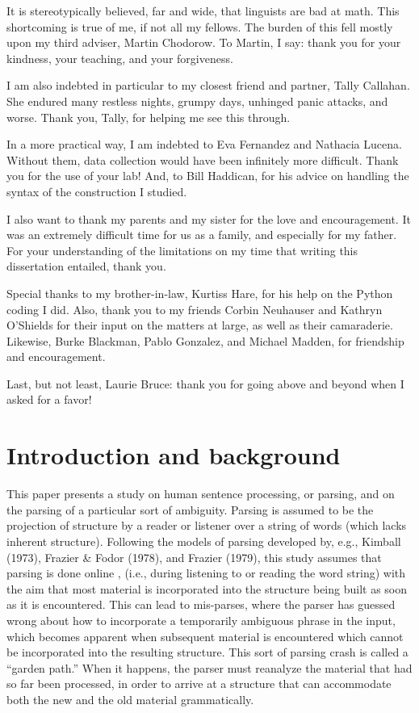 \documentclass[12pt,oneside]{book}
\begin{document}
It is stereotypically believed, far and wide, that linguists are bad at math. This shortcoming is true of me, if not all my fellows. The burden of this fell mostly upon my third adviser, Martin Chodorow. To Martin, I say: thank you for your kindness, your teaching, and your forgiveness.

I am also indebted in particular to my closest friend and partner, Tally Callahan. She endured many restless nights, grumpy days, unhinged panic attacks, and worse. Thank you, Tally, for helping me see this through.

In a more practical way, I am indebted to Eva Fernandez and Nathacia Lucena. Without them, data collection would have been infinitely more difficult. Thank you for the use of your lab! And, to Bill Haddican, for his advice on handling the syntax of the construction I studied.

I also want to thank my parents and my sister for the love and encouragement. It was an extremely difficult time for us as a family, and especially for my father. For your understanding of the limitations on my time that writing this dissertation entailed, thank you.

Special thanks to my brother-in-law, Kurtiss Hare, for his help on the Python coding I did. Also, thank you to my friends Corbin Neuhauser and Kathryn O'Shields for their input on the matters at large, as well as their camaraderie. Likewise, Burke Blackman, Pablo Gonzalez, and Michael Madden, for friendship and encouragement.

Last, but not least, Laurie Bruce: thank you for going above and beyond when I asked for a favor!

\pagebreak


\hypertarget{introduction-and-background}{%
\chapter{Introduction and background}\label{introduction-and-background}}

This paper presents a study on human sentence processing, or parsing, and on the parsing of a particular sort of ambiguity. Parsing is assumed to be the projection of structure by a reader or listener over a string of words (which lacks inherent structure). Following the models of parsing developed by, e.g., Kimball (1973), Frazier \& Fodor (1978), and Frazier (1979), this study assumes that parsing is done online , (i.e., during listening to or reading the word string) with the aim that most material is incorporated into the structure being built as soon as it is encountered. This can lead to mis-parses, where the parser has guessed wrong about how to incorporate a temporarily ambiguous phrase in the input, which becomes apparent when subsequent material is encountered which cannot be incorporated into the resulting structure. This sort of parsing crash is called a ``garden path.'' When it happens, the parser must reanalyze the material that had so far been processed, in order to arrive at a structure that can accommodate both the new and the old material grammatically.
\end{document}
